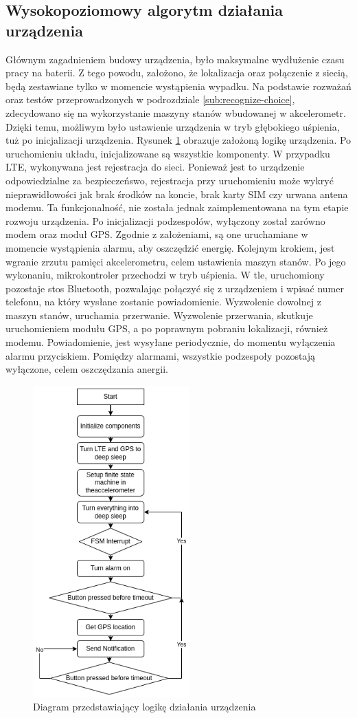 \subsection{Wysokopoziomowy algorytm działania urządzenia}
Głównym zagadnieniem budowy urządzenia, było maksymalne wydłużenie czasu pracy na baterii. Z tego powodu, założono, że lokalizacja oraz połączenie z siecią, będą zestawiane tylko w momencie wystąpienia wypadku. Na podstawie rozważań oraz testów przeprowadzonych w podrozdziale \ref{sub:recognize-choice}, zdecydowano się na wykorzystanie maszyny stanów wbudowanej w akcelerometr. Dzięki temu, możliwym było ustawienie urządzenia w tryb głębokiego uśpienia, tuż po inicjalizacji urządzenia.
Rysunek \ref{img:app_logic} obrazuje założoną logikę urządzenia. Po uruchomieniu układu, inicjalizowane są wszystkie komponenty. W przypadku LTE, wykonywana jest rejestracja do sieci. Ponieważ jest to urządzenie odpowiedzialne za bezpieczeńswo, rejestracja przy uruchomieniu może wykryć nieprawidłowości jak brak środków na koncie, brak karty SIM czy urwana antena modemu. Ta funkcjonalność, nie została jednak zaimplementowana na tym etapie rozwoju urządzenia. Po inicjalizacji podzespołów, wyłączony został zarówno modem oraz moduł GPS. Zgodnie z założeniami, są one uruchamiane w momencie wystąpienia alarmu, aby oszczędzić energię. Kolejnym krokiem, jest wgranie zrzutu pamięci akcelerometru, celem ustawienia maszyn stanów. Po jego wykonaniu, mikrokontroler przechodzi w tryb uśpienia. W tle, uruchomiony pozostaje stos Bluetooth, pozwalając połączyć się z urządzeniem i wpisać numer telefonu, na który wysłane zostanie powiadomienie. Wyzwolenie dowolnej z maszyn stanów, uruchamia przerwanie. Wyzwolenie przerwania, skutkuje uruchomieniem modułu GPS, a po poprawnym pobraniu lokalizacji, również modemu. Powiadomienie, jest wysyłane periodycznie, do momentu wyłączenia alarmu przyciskiem. Pomiędzy alarmami, wszystkie podzespoły pozostają wyłączone, celem oszczędzania anergii.
\begin{figure}[h]
    \centering
    \includegraphics[width=6cm]{Graphics/APP_logic.png}
    \caption{Diagram przedstawiający logikę działania urządzenia}
    \label{img:app_logic}
\end{figure}
